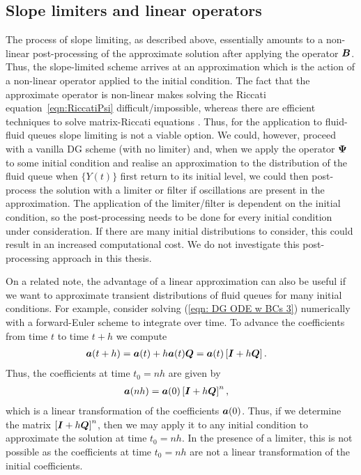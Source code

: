 \subsection{Slope limiters and linear operators}\label{sec: limiting and linearity}
The process of slope limiting, as described above, essentially amounts to a non-linear post-processing of the approximate solution after applying the operator \(\boldsymbol B\). Thus, the slope-limited scheme arrives at an approximation which is the action of a non-linear operator applied to the initial condition. The fact that the approximate operator is non-linear makes solving the Riccati equation~\ref{eqn:RiccatiPsi} difficult/impossible, whereas there are efficient techniques to solve matrix-Riccati equations \cite{bot08}. Thus, for the application to fluid-fluid queues slope limiting is not a viable option. We could, however, proceed with a vanilla DG scheme (with no limiter) and, when we apply the operator \(\boldsymbol \Psi\) to some initial condition and realise an approximation to the distribution of the fluid queue when \(\{Y(t)\}\) first return to its initial level, we could then post-process the solution with a limiter or filter if oscillations are present in the approximation. The application of the limiter/filter is dependent on the initial condition, so the post-processing needs to be done for every initial condition under consideration. If there are many initial distributions to consider, this could result in an increased computational cost. We do not investigate this post-processing approach in this thesis. 

On a related note, the advantage of a linear approximation can also be useful if we want to approximate transient distributions of fluid queues for many initial conditions. For example, consider solving (\ref{eqn: DG ODE w BCs 3}) numerically with a forward-Euler scheme to integrate over time. To advance the coefficients from time \(t\) to time \(t+h\) we compute
\begin{align*}
	&\boldsymbol a(t+h) = \boldsymbol a(t) + h \boldsymbol a(t)\boldsymbol Q = \boldsymbol a(t)\left[\boldsymbol I + h\boldsymbol Q\right].
\end{align*} 
Thus, the coefficients at time \(t_0=nh\) are given by 
\begin{align*}
	&\boldsymbol a(nh) = \boldsymbol a(0)\left[\boldsymbol I + h\boldsymbol Q\right]^n,
\end{align*} 
which is a linear transformation of the coefficients \(\boldsymbol a(0)\). Thus, if we determine the matrix \(\left[\boldsymbol I + h\boldsymbol Q\right]^n\), then we may apply it to any initial condition to approximate the solution at time \(t_0=nh\). In the presence of a limiter, this is not possible as the coefficients at time \(t_0=nh\) are not a linear transformation of the initial coefficients. 

